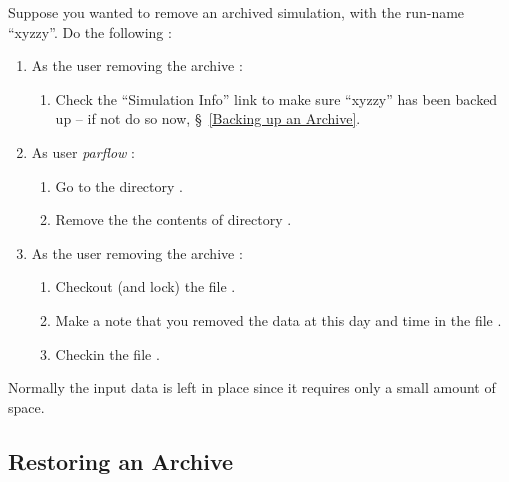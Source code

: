 Suppose you wanted to remove an archived simulation, with the
run-name ``xyzzy''.  Do the following :
\begin{enumerate}
\item As the user removing the archive :
      \begin{enumerate}
      \item Check the ``Simulation Info'' link to make sure ``xyzzy''
            has been backed up -- if not do so now,
            \S~\ref{Backing up an Archive}.
      \end{enumerate}
\item As user {\it parflow} :
      \begin{enumerate}
      \item Go to the directory .
      \item Remove the the contents of directory .
      \end{enumerate}
\item As the user removing the archive :
      \begin{enumerate}
      \item Checkout (and lock) the file .
      \item Make a note that you removed the data at this day and
            time in the file .
      \item Checkin the file .
      \end{enumerate}
\end{enumerate}

Normally the input data is left in place since it requires only
a small amount of space.


\subsection{Restoring an Archive}
\label{Restoring an Archive}


